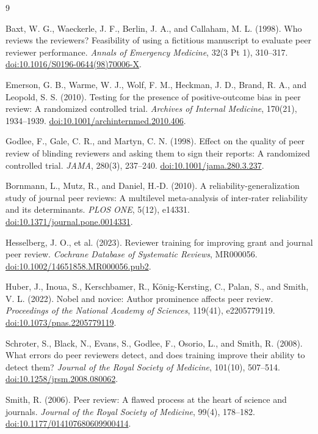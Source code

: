 \documentclass[11pt]{article}
\begin{document}
\begin{thebibliography}{9}


Baxt, W. G., Waeckerle, J. F., Berlin, J. A., and Callaham, M. L. (1998).
Who reviews the reviewers? Feasibility of using a fictitious manuscript to evaluate peer reviewer performance.
\textit{Annals of Emergency Medicine}, 32(3 Pt 1), 310--317.
\href{https://doi.org/10.1016/S0196-0644(98)70006-X}{doi:10.1016/S0196-0644(98)70006-X}.

Emerson, G. B., Warme, W. J., Wolf, F. M., Heckman, J. D., Brand, R. A., and Leopold, S. S. (2010).
Testing for the presence of positive-outcome bias in peer review: A randomized controlled trial.
\textit{Archives of Internal Medicine}, 170(21), 1934--1939.
\href{https://doi.org/10.1001/archinternmed.2010.406}{doi:10.1001/archinternmed.2010.406}.

Godlee, F., Gale, C. R., and Martyn, C. N. (1998).
Effect on the quality of peer review of blinding reviewers and asking them to sign their reports: A randomized controlled trial.
\textit{JAMA}, 280(3), 237--240.
\href{https://doi.org/10.1001/jama.280.3.237}{doi:10.1001/jama.280.3.237}.

Bornmann, L., Mutz, R., and Daniel, H.-D. (2010).
A reliability-generalization study of journal peer reviews: A multilevel meta-analysis of inter-rater reliability and its determinants.
\textit{PLOS ONE}, 5(12), e14331.
\href{https://doi.org/10.1371/journal.pone.0014331}{doi:10.1371/journal.pone.0014331}.

Hesselberg, J. O., et al. (2023).
Reviewer training for improving grant and journal peer review.
\textit{Cochrane Database of Systematic Reviews}, MR000056.
\href{https://doi.org/10.1002/14651858.MR000056.pub2}{doi:10.1002/14651858.MR000056.pub2}.

Huber, J., Inoua, S., Kerschbamer, R., K{\"o}nig-Kersting, C., Palan, S., and Smith, V. L. (2022).
Nobel and novice: Author prominence affects peer review.
\textit{Proceedings of the National Academy of Sciences}, 119(41), e2205779119.
\href{https://doi.org/10.1073/pnas.2205779119}{doi:10.1073/pnas.2205779119}.

Schroter, S., Black, N., Evans, S., Godlee, F., Osorio, L., and Smith, R. (2008).
What errors do peer reviewers detect, and does training improve their ability to detect them?
\textit{Journal of the Royal Society of Medicine}, 101(10), 507--514.
\href{https://doi.org/10.1258/jrsm.2008.080062}{doi:10.1258/jrsm.2008.080062}.

Smith, R. (2006).
Peer review: A flawed process at the heart of science and journals.
\textit{Journal of the Royal Society of Medicine}, 99(4), 178--182.
\href{https://doi.org/10.1177/014107680609900414}{doi:10.1177/014107680609900414}.

\end{thebibliography}
\end{document}

